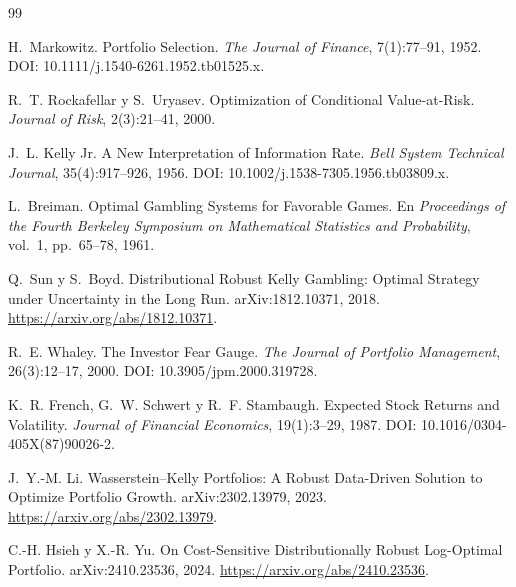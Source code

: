 \documentclass[11pt]{article}
\begin{document}
\begin{thebibliography}{99}


H.~Markowitz.
\newblock Portfolio Selection.
\newblock \emph{The Journal of Finance}, 7(1):77--91, 1952.
\newblock DOI: 10.1111/j.1540-6261.1952.tb01525.x.

R.~T. Rockafellar y S.~Uryasev.
\newblock Optimization of Conditional Value-at-Risk.
\newblock \emph{Journal of Risk}, 2(3):21--41, 2000.

J.~L. Kelly Jr.
\newblock A New Interpretation of Information Rate.
\newblock \emph{Bell System Technical Journal}, 35(4):917--926, 1956.
\newblock DOI: 10.1002/j.1538-7305.1956.tb03809.x.

L.~Breiman.
\newblock Optimal Gambling Systems for Favorable Games.
\newblock En \emph{Proceedings of the Fourth Berkeley Symposium on
  Mathematical Statistics and Probability}, vol.~1, pp.~65--78, 1961.

Q.~Sun y S.~Boyd.
\newblock Distributional Robust Kelly Gambling: Optimal Strategy under
  Uncertainty in the Long Run.
\newblock arXiv:1812.10371, 2018.
\newblock \url{https://arxiv.org/abs/1812.10371}.

R.~E. Whaley.
\newblock The Investor Fear Gauge.
\newblock \emph{The Journal of Portfolio Management}, 26(3):12--17, 2000.
\newblock DOI: 10.3905/jpm.2000.319728.

K.~R. French, G.~W. Schwert y R.~F. Stambaugh.
\newblock Expected Stock Returns and Volatility.
\newblock \emph{Journal of Financial Economics}, 19(1):3--29, 1987.
\newblock DOI: 10.1016/0304-405X(87)90026-2.

J.~Y.-M. Li.
\newblock Wasserstein--Kelly Portfolios: A Robust Data-Driven Solution to
  Optimize Portfolio Growth.
\newblock arXiv:2302.13979, 2023.
\newblock \url{https://arxiv.org/abs/2302.13979}.

C.-H. Hsieh y X.-R. Yu.
\newblock On Cost-Sensitive Distributionally Robust Log-Optimal Portfolio.
\newblock arXiv:2410.23536, 2024.
\newblock \url{https://arxiv.org/abs/2410.23536}.


\end{thebibliography}
\end{document}
